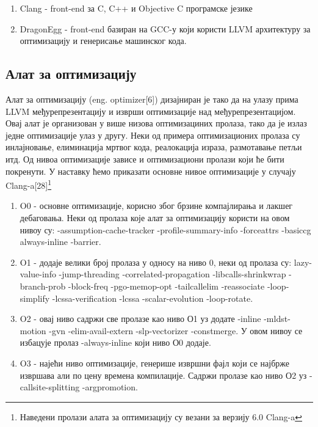 \documentclass[12pt,oneside]{memoir}
\begin{document}
 \begin{enumerate}
 \item Clang - front-end за  C, C++ и Objective C програмске језике
 \item DragonEgg -  front-end базиран на GCC-у који користи LLVM архитектуру за оптимизацију  
 				 и генерисање машинског кода.
 \end{enumerate}

 \subsection{Алат за оптимизацију}
 Алат за оптимизацију (eng. optimizer[6]) дизајниран је тако да на улазу прима LLVM
 међурепрезентацију и изврши оптимизације над међурепрезентацијом.
 Овај алат је организован у више низова оптимизациних пролаза, тако да је излаз
 једне оптимизације улаз у другу.
 Неки од примера оптимизационих пролаза су инлајновање, елиминација мртвог кода,
 реалокација израза, размотавање петљи итд. 
 Од нивоа оптимизације зависе и оптимизациони пролази који ће бити покренути.
 У наставку ћемо приказати основне нивое оптимизације у случају Clang-a[28]\footnote{Наведени пролази алата за оптимизацију су везани за верзију 6.0 Clang-a}
 \begin{enumerate}
 \item O0 -  основне оптимизације, корисно због брзине компајлирања и лакшег
 			дебаговања.
 			Неки од пролаза које алат за оптимизацију користи на овом нивоу су:
 			-assumption-cache-tracker -profile-summary-info -forceattrs -basiccg 		                                   always-inline -barrier.
 \item O1 - додаје велики број пролаза у односу на ниво 0, неки од пролаза су:
           lazy-value-info -jump-threading -correlated-propagation -libcalls-shrinkwrap -branch-prob -block-freq -pgo-memop-opt -tailcallelim -reassociate -loop-simplify -lcssa-verification -lcssa -scalar-evolution -loop-rotate. 
           
 \item O2 - овај ниво садржи све пролазе као ниво О1 уз додате -inline -mldst-motion -gvn -elim-avail-extern -slp-vectorizer -constmerge. У овом нивоу се избацује пролаз
 	-always-inline који ниво О0 додаје.
 \item O3 - најећи ниво оптимизације, генерише извршни фајл који се најбрже извршава
 	али по цену времена компилације. Садржи пролазе као ниво О2 уз -callsite-splitting -argpromotion.
 \end{enumerate}
\end{document}
